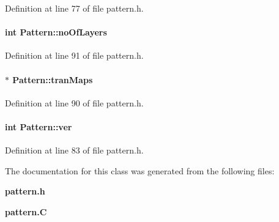 Definition at line 77 of file pattern.h.\label{Pattern_o8}
\paragraph{\setlength{\rightskip}{0pt plus 5cm}int Pattern::no\-Of\-Layers\hspace{0.3cm}{\tt  [private]}}\hfill



Definition at line 91 of file pattern.h.\label{Pattern_o7}
\paragraph{ $\ast$ Pattern::tran\-Maps\hspace{0.3cm}{\tt  [private]}}\hfill



Definition at line 90 of file pattern.h.\label{Pattern_o5}
\paragraph{\setlength{\rightskip}{0pt plus 5cm}int Pattern::ver\hspace{0.3cm}{\tt  [private]}}\hfill



Definition at line 83 of file pattern.h.

The documentation for this class was generated from the following files:\begin{CompactItemize}
\item 
{\bf pattern.h}\item 
{\bf pattern.C}\end{CompactItemize}
